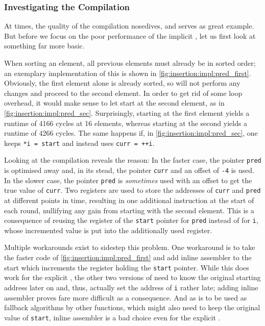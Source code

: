 \subsubsection*{Investigating the Compilation}
\label{subsubsec:tasklet:insertion:compiler}

At times, the quality of the compilation nosedives, and \IS{} serves as great example.
But before we focus on the poor performance of the implicit \IS{}, let us first look at something far more basic.

When sorting an element, all previous elements must already be in sorted order;
an exemplary implementation of this is shown in \cref{fig:insertion:impl:pred_first}.
Obviously, the first element alone is already sorted, so \IS{} will not perform any changes and proceed to the second element.
In order to get rid of some loop overhead, it would make sense to let \IS{} start at the second element, as in \cref{fig:insertion:impl:pred_sec}.
Surprisingly, starting at the first element yields a runtime of 4166 cycles at 16 elements, whereas starting at the second yields a runtime of 4266 cycles.
The same happens if, in \cref{fig:insertion:impl:pred_sec}, one keeps \lstinline|*i = start| and instead uses \lstinline|curr = ++i|.

Looking at the compilation reveals the reason:
In the faster case, the pointer \lstinline|pred| is optimised away and, in its stead, the pointer \lstinline|curr| and an offset of \lstinline|-4| is used.
In the slower case, the pointer \lstinline|pred| is \emph{sometimes} used with an offset to get the true value of \lstinline|curr|.
Two registers are used to store the addresses of \lstinline|curr| and \lstinline|pred| at different points in time, resulting in one additional instruction at the start of each round, nullifying any gain from starting with the second element.
This is a consequence of reusing the register of the \lstinline|start| pointer for \lstinline|pred| instead of for \lstinline|i|, whose incremented value is put into the additionally used register.

Multiple workarounds exist to sidestep this problem.
One workaround is to take the faster code of \cref{fig:insertion:impl:pred_first} and add inline assembler to the start which increments the register holding the \lstinline|start| pointer.
While this does work for the explicit \IS{}, the other two versions of \IS{} need to know the original starting address later on and, thus, actually set the address of \lstinline|i| rather late;
adding inline assembler proves fare more difficult as a consequence.
And as \IS{} is to be used as fallback algorithms by other functions, which might also need to keep the original value of \lstinline|start|, inline assembler is a bad choice even for the explicit \IS{}.

